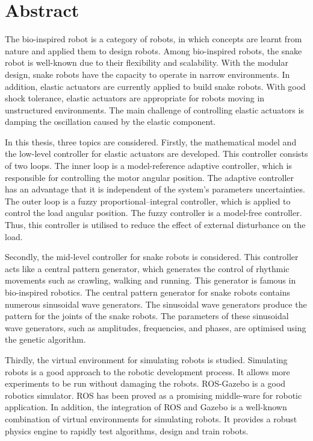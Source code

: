 \documentclass[../../main.tex]{subfiles}
\begin{document}
\chapter*{Abstract}

The bio-inspired robot is a category of robots, in which concepts are learnt from nature and applied them to design robots. Among bio-inspired robots, the snake robot is well-known due to their flexibility and scalability. With the modular design, snake robots have the capacity to operate in narrow environments. In addition, elastic actuators are currently applied to build snake robots. With good shock tolerance, elastic actuators are appropriate for robots moving in unstructured environments. The main challenge of controlling elastic actuators is damping the oscillation caused by the elastic component.

In this thesis, three topics are considered. Firstly, the mathematical model and the low-level controller for elastic actuators are developed. This controller consists of two loops. The inner loop is a model-reference adaptive controller, which is responsible for controlling the motor angular position. The adaptive controller has an advantage that it is independent of the system's parameters uncertainties. The outer loop is a fuzzy proportional–integral controller, which is applied to control the load angular position. The fuzzy controller is a model-free controller. Thus, this controller is utilised to reduce the effect of external disturbance on the load.

Secondly, the mid-level controller for snake robots is considered. This controller acts like a central pattern generator, which generates the control of rhythmic movements such as crawling, walking and running. This generator is famous in bio-inspired robotics. The central pattern generator for snake robots contains numerous sinusoidal wave generators. The sinusoidal wave generators produce the pattern for the joints of the snake robots. The parameters of these sinusoidal wave generators, such as amplitudes, frequencies, and phases, are optimised using the genetic algorithm.

Thirdly, the virtual environment for simulating robots is studied. Simulating robots is a good approach to the robotic development process. It allows more experiments to be run without damaging the robots. ROS-Gazebo is a good robotics simulator. ROS has been proved as a promising middle-ware for robotic application. In addition, the integration of ROS and Gazebo is a well-known combination of virtual environments for simulating robots. It provides a robust physics engine to rapidly test algorithms, design and train robots.
\end{document}

